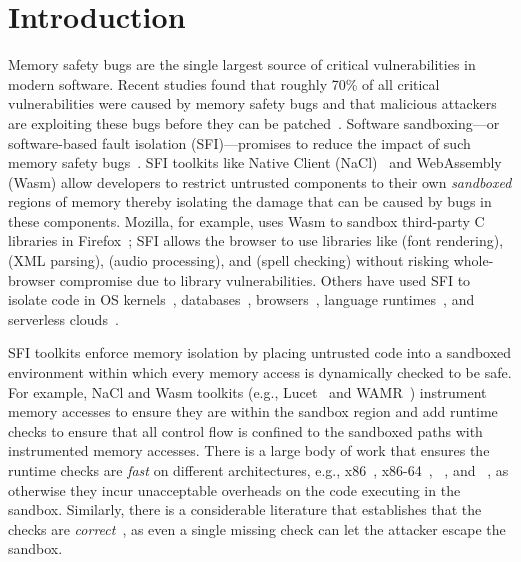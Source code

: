 \section{Introduction}
\label{sec:intro}

Memory safety bugs are the single largest source of critical vulnerabilities 
in modern software. Recent studies found that roughly 70\% of all critical 
vulnerabilities were caused by memory safety bugs \cite{msf-bugs,chr-bugs} and 
that malicious attackers are exploiting these bugs before they can be 
patched~\cite{p0:in-the-wild:21, fireeye-study}.
%
Software sandboxing\dash---or software-based fault isolation
(SFI)\dash---promises to reduce the impact of such memory safety
bugs~\cite{gang-sfi, wahbe_efficient_1993}.
%
SFI toolkits like Native Client (NaCl)~\cite{yee_native_2009} and WebAssembly (Wasm) allow
developers to restrict untrusted components to their own \emph{sandboxed}
regions of memory thereby isolating the damage that can be caused by bugs in
these components.
%
Mozilla, for example, uses Wasm to sandbox third-party C libraries in
Firefox~\cite{rlbox, rlbox-blog}; SFI allows the browser to use libraries
like \libgraphite (font rendering), \libexpat (XML parsing), \libsoundtouch
(audio processing), and \hunspell (spell checking) without risking
whole-browser compromise due to library vulnerabilities.
%
Others have used SFI to isolate code in 
OS kernels~\cite{xfi, bgi,herder2009fault, vino}, 
databases~\cite{vx32, vxa, wahbe_efficient_1993}, 
browsers~\cite{omniware,yee_native_2009,haas_bringing_2017}, 
language runtimes~\cite{robusta, rockjit}, and 
serverless clouds~\cite{lucet-talk, cloudflare, sledge}.

SFI toolkits enforce memory isolation by placing untrusted 
code into a sandboxed environment within which every memory access 
is dynamically checked to be safe.
%
For example, NaCl and Wasm toolkits (e.g., Lucet~\cite{lucet} and
WAMR~\cite{wamr}) instrument memory accesses to ensure they are 
within the sandbox region and add runtime checks to ensure that 
all control flow is confined to the sandboxed paths with 
instrumented memory accesses.
%
There is a large body of work that ensures 
the runtime checks are \emph{fast} on different 
architectures, e.g., x86~\cite{mccamant_evaluating_2006, yee_native_2009, vx32, payer2011fine}, 
x86-64~\cite{sehr_adapting_2010}, \SPARC~\cite{omniware-pldi},
and \ARM~\cite{armor, armlock, sehr_adapting_2010}, as otherwise 
they incur unacceptable overheads on the code executing in the sandbox.
%
Similarly, there is a considerable literature 
that establishes that the checks are \emph{correct}~\cite{rocksalt, compcert-sfi, veriwasm, sfi-as-ai,besson2019compiling},
as even a single missing check can let 
the attacker escape the sandbox.

